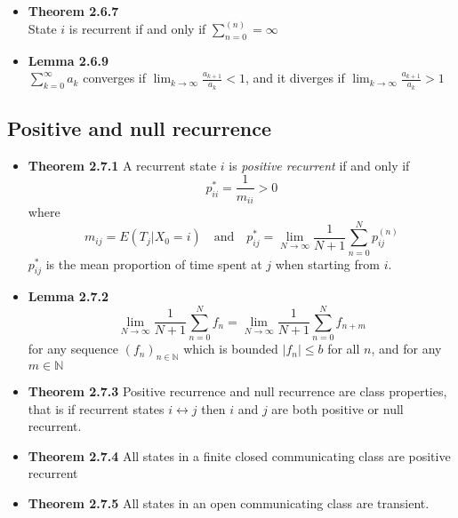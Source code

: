 \documentclass[11pt,a4paper]{article}
\begin{document}
\begin{itemize}
    \item \textbf{Theorem 2.6.7} \\
        State $i$ is recurrent if and only if $\sum_{n=0}^{(n)} = \infty$

    \item \textbf{Lemma 2.6.9} \\
        $\sum_{k=0}^{\infty}a_k$ converges if $\lim_{k \to \infty} \frac{a_{k+1}}{a_k} < 1$,
        and it diverges if $\lim_{k \to \infty} \frac{a_{k+1}}{a_k} > 1$

\end{itemize}

\subsection{Positive and null recurrence}

\begin{itemize}

    \item \textbf{Theorem 2.7.1} A recurrent state $i$ is \emph{positive recurrent} if and only if
        \[
            p_{ii}^* = \frac{1}{m_{ii}} > 0
        \]
        where
        \[
            m_{ij} = E(T_j | X_0 = i) \quad \text{and} \quad p_{ij}^* = \lim_{N \to \infty}
            \frac{1}{N+1} \sum_{n=0}^N p_{ij}^{(n)}
        \]
        $p_{ij}^*$ is the mean proportion of time spent at $j$ when starting from $i$.

    \item \textbf{Lemma 2.7.2} \\
        \[
            \lim_{N \to \infty} \frac{1}{N+1} \sum_{n=0}^N f_n = \lim_{N\to \infty}
            \frac{1}{N+1} \sum_{n=0}^N f_{n+m}
        \]
        for any sequence ${(f_n)}_{n \in \mathbb{N}}$ which is bounded $|f_n| \leq b$ for all $n$,
        and for any $m \in \mathbb{N}$


    \item \textbf{Theorem 2.7.3}
        Positive recurrence and null recurrence are class properties, that is if recurrent states
        $i \leftrightarrow j$ then $i$ and $j$ are both positive or null recurrent.

    \item \textbf{Theorem 2.7.4}
        All states in a finite closed communicating class are positive recurrent

    \item \textbf{Theorem 2.7.5} All states in an open communicating class are transient.

\end{itemize}
\end{document}
